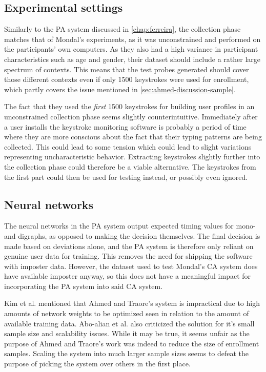 \documentclass[informationsecurity]{gucmasterproject}
\begin{document}
\subsection{Experimental settings}
Similarly to the PA system discussed in \cref{chap:ferreira}, the collection phase matches that of Mondal's \cite{mondal} experiments, as it was unconstrained and performed on the participants' own computers.
As they also had a high variance in participant characteristics such as age and gender, their dataset should include a rather large spectrum of contexts.
This means that the test probes generated should cover those different contexts even if only 1500 keystrokes were used for enrollment, which partly covers the issue mentioned in \cref{sec:ahmed-discussion-sample}.

The fact that they used the \textit{first} 1500 keystrokes for building user profiles in an unconstrained collection phase seems slightly counterintuitive.
Immediately after a user installs the keystroke monitoring software is probably a period of time where they are more conscious about the fact that their typing patterns are being collected. 
This could lead to some tension which could lead to slight variations representing uncharacteristic behavior.
Extracting keystrokes slightly further into the collection phase could therefore be a viable alternative.
The keystrokes from the first part could then be used for testing instead, or possibly even ignored.


\subsection{Neural networks}
The neural networks in the PA system output expected timing values for mono- and digraphs, as opposed to making the decision themselves.
The final decision is made based on deviations alone, and the PA system is therefore only reliant on genuine user data for training.
This removes the need for shipping the software with imposter data.
However, the dataset used to test Mondal's \cite{mondal} CA system does have available imposter anyway, so this does not have a meaningful impact for incorporating the PA system into said CA system.

Kim et al. \cite{KIM2017} mentioned that Ahmed and Traore's system is impractical due to high amounts of network weights to be optimized seen in relation to the amount of available training data.
Abo-alian et al. \cite{CPE3718} also criticized the solution for it's small sample size and scalability issues.
While it may be true, it seems unfair as the purpose of Ahmed and Traore's work was indeed to reduce the size of enrollment samples.
Scaling the system into much larger sample sizes seems to defeat the purpose of picking the system over others in the first place.
\end{document}
